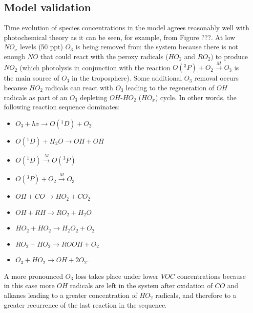 \documentclass[11pt,a4paper]{article}
\begin{document}
\subsection{Model validation}
Time evolution of species concentrations in the model agrees reasonably well with photochemical theory as it can be seen, for example, from Figure ???. At low $NO_x$ levels (50 ppt) $O_3$ is being removed from the system because there is not enough $NO$ that could react with the peroxy radicals ($HO_2$ and $RO_2$) to produce $NO_2$ (which photolysis in conjunction with the reaction $O(^3P)+O_2\xrightarrow{M} O_3$ is the main source of $O_3$ in the troposphere). Some additional $O_3$ removal occurs because $HO_2$ radicals can react with $O_3$ leading to the regeneration of $OH$ radicals as part of an $O_3$ depleting $OH$-$HO_2$ ($HO_x$) cycle. In other words, the following reaction sequence dominates:
\begin{itemize}
\item[] $O_3 + hv \rightarrow O(^1D) + O_2$
\item[] $O(^1D) + H_2O \rightarrow OH + OH$
\item[] $O(^1D) \xrightarrow{M} O(^3P)$
\item[] $O(^3P) + O_2 \xrightarrow{M} O_3$
\item[] $OH + CO \rightarrow HO_2 + CO_2$
\item[] $OH + RH \rightarrow RO_2 + H_2O$
\item[] $HO_2 + HO_2 \rightarrow H_2O_2 + O_2$
\item[] $RO_2 + HO_2 \rightarrow ROOH + O_2$
\item[] $O_3 + HO_2 \rightarrow OH + 2O_2$.
\end{itemize}
A more pronounced $O_3$ loss takes place under lower $VOC$ concentrations because in this case more $OH$ radicals are left in the system after oxidation of $CO$ and alkanes leading to a greater concentration of $HO_2$ radicals, and therefore to a greater recurrence of the last reaction in the sequence.

\end{document}
